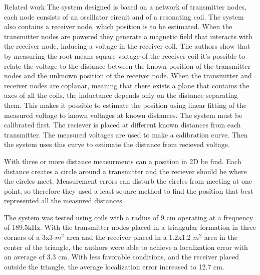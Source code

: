 \begin{section}{Related work}
    The system designed is based on a network of transmitter nodes, each node consists of an oscillator circuit and of a resonating coil.
    The system also contains a receiver node, which position is to be estimated.
    When the transmitter nodes are powered they generate a magnetic field that interacts with the receiver node, inducing a voltage in the receiver coil.
    The authors show that by measuring the root-means-square voltage of the receiver coil it's possible to relate the voltage to the distance between the known position of the transmitter nodes and the unknown position of the receiver node.
    When the transmitter and receiver nodes are coplanar, meaning that there exists a plane that contains the axes of all the coils, the inductance depends only on the distance separating them. 
    This makes it possible to estimate the position using linear fitting of the measured voltage to known voltages at known distances.
    The system must be calibrated first. The reciever is placed at different known distances from each transmitter. The measured voltages are used to make a calibration curve. Then the system uses this curve to estimate the distance from recieved voltage.

    With three or more distance measurments can a position in 2D be find. Each distance creates a circle around a transmitter and the reciever should be where the circles meet. Measurement errors can disturb the circles from meeting at one point, so therefore they used a least-square method to find the position that best represented all the measured distances.

    The system was tested using coils with a radius of 9 cm operating at a frequency of 189.5kHz.
    With the transmitter nodes placed in a triangular formation in three corners of a 3x3 $m^2$ area and the receiver placed in a 1.2x1.2 $m^2$ area in the center of the triangle, the authors were able to achieve a localization error with an average of 3.3 cm.
    With less favorable conditions, and the receiver placed outside the triangle, the average localization error increased to 12.7 cm.
\end{section}